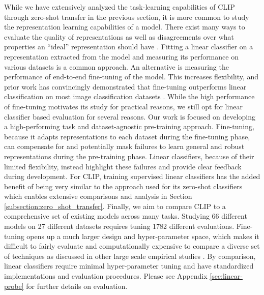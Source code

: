 While we have extensively analyzed the task-learning capabilities of CLIP through zero-shot transfer in the previous section, it is more common to study the representation learning capabilities of a model. There exist many ways to evaluate the quality of representations as well as disagreements over what properties an ``ideal'' representation should have \citep{locatello2020sober}. Fitting a linear classifier on a representation extracted from the model and measuring its performance on various datasets is a common approach. An alternative is measuring the performance of end-to-end fine-tuning of the model. This increases flexibility, and prior work has convincingly demonstrated that fine-tuning outperforms linear classification on most image classification datasets \citep{kornblith2019better,zhai2019large}. While the high performance of fine-tuning motivates its study for practical reasons, we still opt for linear classifier based evaluation for several reasons. Our work is focused on developing a high-performing task and dataset-agnostic pre-training approach. Fine-tuning, because it adapts representations to each dataset during the fine-tuning phase, can compensate for and potentially mask failures to learn general and robust representations during the pre-training phase. Linear classifiers, because of their limited flexibility, instead highlight these failures and provide clear feedback during development. For CLIP, training supervised linear classifiers has the added benefit of being very similar to the approach used for its zero-shot classifiers which enables extensive comparisons and analysis in Section \ref{subsection:zero_shot_transfer}. Finally, we aim to compare CLIP to a comprehensive set of existing models across many tasks. Studying 66 different models on 27 different datasets requires tuning 1782 different evaluations. Fine-tuning opens up a much larger design and hyper-parameter space, which makes it difficult to fairly evaluate and computationally expensive to compare a diverse set of techniques as discussed in other large scale empirical studies \citep{lucic2018gans,choi2019empirical}. By comparison, linear classifiers require minimal hyper-parameter tuning and have standardized implementations and evaluation procedures. Please see Appendix \ref{sec:linear-probe} for further details on evaluation.

